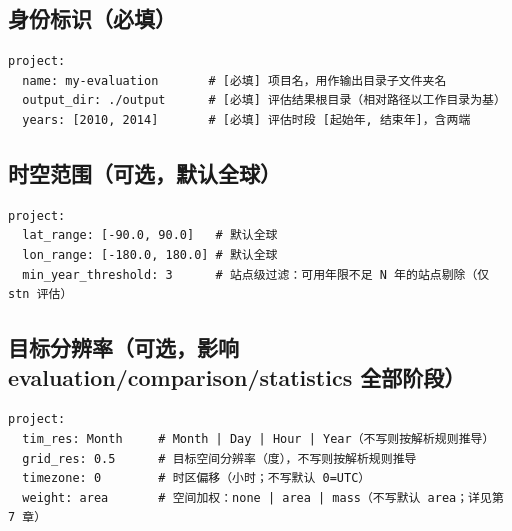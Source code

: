 \subsection{身份标识（必填）}

\begin{verbatim}
project:
  name: my-evaluation       # [必填] 项目名，用作输出目录子文件夹名
  output_dir: ./output      # [必填] 评估结果根目录（相对路径以工作目录为基）
  years: [2010, 2014]       # [必填] 评估时段 [起始年, 结束年]，含两端
\end{verbatim}


\subsection{时空范围（可选，默认全球）}

\begin{verbatim}
project:
  lat_range: [-90.0, 90.0]   # 默认全球
  lon_range: [-180.0, 180.0] # 默认全球
  min_year_threshold: 3      # 站点级过滤：可用年限不足 N 年的站点剔除（仅 stn 评估）
\end{verbatim}


\subsection{目标分辨率（可选，影响 evaluation/comparison/statistics 全部阶段）}

\begin{verbatim}
project:
  tim_res: Month     # Month | Day | Hour | Year（不写则按解析规则推导）
  grid_res: 0.5      # 目标空间分辨率（度），不写则按解析规则推导
  timezone: 0        # 时区偏移（小时；不写默认 0=UTC）
  weight: area       # 空间加权：none | area | mass（不写默认 area；详见第 7 章）
\end{verbatim}


